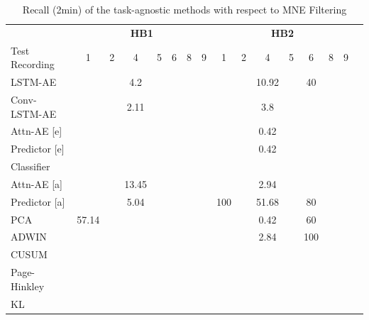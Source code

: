 \begin{table}[btp]
\centering
\caption{Recall (2min) of the task-agnostic methods with respect to MNE Filtering}
\label{tab8}

\begin{tabular}{lccccccccccccccc}
\toprule
          & \multicolumn{7}{c}{\textbf{HB1}} & \multicolumn{7}{c}{\textbf{HB2}} \\
\cmidrule(lr){2-8}\cmidrule(lr){9-15}
Test Recording & 1 & 2 & 4 & 5 & 6 & 8 & 9 & 1 & 2 & 4 & 5 & 6 & 8 & 9 \\
\cmidrule(lr){2-8}\cmidrule(lr){9-15}
LSTM-AE  & &   &  4.2     &       &       &       &       &       &  &   10.92    &   &  40 &       &         \\
Conv-LSTM-AE & &     &   2.11    &  &       &       &       &       &       &   3.8    &       &      &       &         \\
\midrule
Attn-AE [e]& &     &       &       &       &       &       &       &       &   0.42    &       &       &       &         \\
Predictor [e]  &&     &       &       &       &       &       &       &       &   0.42    &       &       &       &         \\
Classifier  &&     &       &       &       &       &       &       &       &       &       &       &       &         \\
\midrule
Attn-AE [a] & & & 13.45 &  &  & & & & & 2.94 &  & & & \\
Predictor [a]  & &    & 5.04  &       &       &       &       & 100   &    &   51.68    &    & 80  &       &         \\
\midrule
PCA      & 57.14  &     &       &   &    &    &    &   &    &  0.42 &  & 60 &    &     \\
ADWIN      &   &     &       &     &       &     &       &  &   &    2.84   &   & 100 &   &         \\
CUSUM      &   &     &       &    &       &    &       &  &    &       &   &  &   &         \\
Page-Hinkley      &   &     &       &    &       &    &       &   &   &       &  &  &    &         \\
KL      &   &     &       &    &       &    &       &   &  &       &  &  &    &         \\
\bottomrule
\end{tabular}

\end{table}

